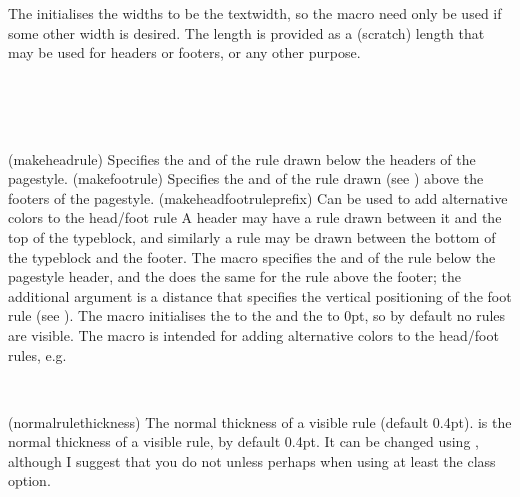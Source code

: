 \begin{plainlist}
The \cmd{\makepagestyle} initialises the widths to be the textwidth, 
so the macro need only be used if some
other width is desired. The length \lnc{\headwidth} is provided as a
(scratch) length that may be used for headers or 
footers, or any other purpose.

\begin{syntax}
\cmd{\makeheadrule} \\
\cmd{\makefootrule} \\
\cmd{\makeheadfootruleprefix}\\
\end{syntax}
\glossary(makeheadrule)%
  {}%
  {Specifies the  and  of the rule drawn below the
   headers of the  pagestyle.}%
\glossary(makefootrule)%
  {}%
  {Specifies the  and  of the rule drawn 
   (see ) above the footers of the
   pagestyle.}%
\glossary(makeheadfootruleprefix)
{}%
{Can be used to add alternative colors to the head/foot rule}%
A header may have a rule drawn between it and the top of 
the typeblock, and similarly a rule may be drawn 
between the bottom of the typeblock and the 
footer. 
The \cmd{\makeheadrule} macro specifies the 
and  of the rule below the  pagestyle 
header, and the \cmd{\makefootrule} does the same for 
the rule above the footer; the
additional  argument is a distance that specifies the vertical
positioning of the foot rule (see \cmd{\footruleskip}).
The \cmd{\makepagestyle} macro initialises the  to the 
\lnc{\textwidth} and the  to 0pt, so by default no rules
are visible. The macro \cmd{\makeheadfootruleprefix} is intended for
adding alternative colors to the head/foot rules, e.g.
\begin{lcode}
\end{lcode}


\begin{syntax}
\lnc{\normalrulethickness} \\
\end{syntax}
\glossary(normalrulethickness)%
  {}%
  {The normal thickness of a visible rule (default 0.4pt).}
\lnc{\normalrulethickness} is the normal 
thickness of a visible rule, by 
default 0.4pt. It can be changed using \cmd{\setlength}, although I suggest 
that you do not unless perhaps when using at least the \Lopt{14pt} class 
option. 


\end{plainlist}
